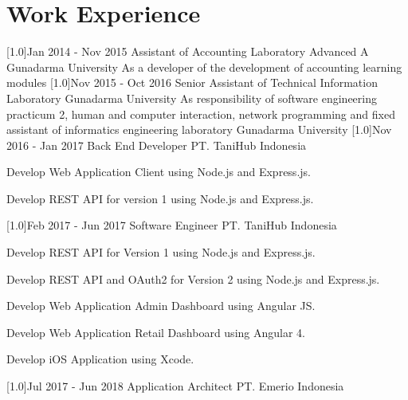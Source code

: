 \documentclass[english]{cv-style}
\begin{document}
\section{Work Experience}
  \vspace{-0.3cm}
\begin{entrylist}
\entry
  {\scalebox{.6}[1.0]{Jan 2014 - Nov 2015}}
  {Assistant of Accounting Laboratory Advanced A}
  {Gunadarma University}
  {As a developer of the development of accounting learning modules}
\entry
  {\scalebox{.6}[1.0]{Nov 2015 - Oct 2016}}
  {Senior Assistant of Technical Information Laboratory}
  {Gunadarma University}
  {As responsibility of software engineering practicum 2, human and computer interaction, network programming and fixed assistant of informatics engineering laboratory Gunadarma University}
\entry
  {\scalebox{.6}[1.0]{Nov 2016 - Jan 2017}}
  {Back End Developer}
  {PT. TaniHub Indonesia}
  {\vspace{-0.3cm}
  \begin{itemize}\small{
    \item Develop Web Application Client using Node.js and Express.js.
    \item Develop REST API for version 1 using Node.js and Express.js.}
  \end{itemize}}
\entry
  {\scalebox{.6}[1.0]{Feb 2017 - Jun 2017}}
  {Software Engineer}
  {PT. TaniHub Indonesia}
  {\vspace{-0.3cm}
  \begin{itemize}\small{
    \item Develop REST API for Version 1 using Node.js and Express.js.
    \item Develop REST API and OAuth2 for Version 2 using Node.js and Express.js.
    \item Develop Web Application Admin Dashboard using Angular JS.
    \item Develop Web Application Retail Dashboard using Angular 4.
    \item Develop iOS Application using Xcode.}
  \end{itemize}}
\entry
  {\scalebox{.6}[1.0]{Jul 2017 - Jun 2018}}
  {Application Architect}
  {PT. Emerio Indonesia}
  {\vspace{-0.3cm}
  \begin{itemize}\small{
}
\end{itemize}}
\end{entrylist}
\end{document}
